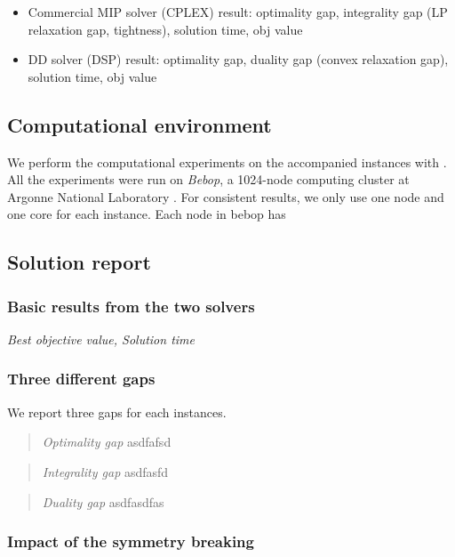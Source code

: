 %
%


\begin{itemize}
	\item Commercial MIP solver (CPLEX) result: optimality gap, integrality gap (LP relaxation gap, tightness), solution time, obj value
	\item DD solver (DSP) result: optimality gap, duality gap (convex relaxation gap), solution time, obj value
\end{itemize}

\subsection{Computational environment}
We perform the computational experiments on the accompanied instances with \siplibtwo. All the experiments were run on \textit{Bebop}, a 1024-node computing cluster at Argonne National Laboratory \cite{bebop}. For consistent results, we only use one node and one core for each instance. Each node in bebop has 

\subsection{Solution report}

\subsubsection {Basic results from the two solvers}
\noindent\textit{Best objective value, Solution time}

\subsubsection{Three different gaps}
We report three gaps for each instances.

\begin{quote}
\noindent\textit{Optimality gap} asdfafsd
\end{quote}

\begin{quote}
\noindent\textit{Integrality gap} asdfasfd
\end{quote}

\begin{quote}
\noindent\textit{Duality gap} asdfasdfas
\end{quote}

\subsubsection{Impact of the symmetry breaking}
%
